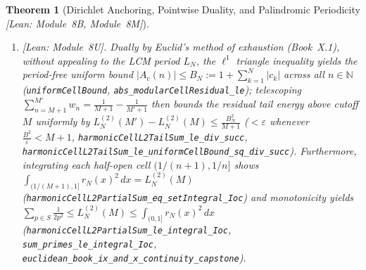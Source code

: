 \documentclass[10pt,a4paper]{article}
\newtheorem{theorem}{Theorem}[section]
\theoremstyle{definition}
\begin{document}
\begin{theorem}[Dirichlet Anchoring, Pointwise Duality, and Palindromic Periodicity \emph{[Lean: Module~8B, Module~8M]}]
\begin{enumerate}[leftmargin=1.8em,itemsep=2pt]
\item \emph{[Lean: Module~8U].} Dually by Euclid's method of exhaustion (Book~X.1), without appealing to the LCM period $L_N$, the $\ell^1$ triangle inequality yields the period-free uniform bound $|A_c(n)| \le B_N := 1 + \sum_{k=1}^N |c_k|$ across all $n \in \mathbb{N}$ (\texttt{uniformCellBound}, \texttt{abs\_\allowbreak modularCellResidual\_\allowbreak le}); telescoping $\sum_{n=M+1}^{M'} w_n = \frac{1}{M+1} - \frac{1}{M'+1}$ then bounds the residual tail energy above cutoff $M$ uniformly by $L_N^{(2)}(M') - L_N^{(2)}(M) \le \frac{B_N^2}{M+1}$ ($< \varepsilon$ whenever $\frac{B^2}{\varepsilon} < M + 1$, \texttt{harmonicCellL2TailSum\_\allowbreak le\_\allowbreak div\_\allowbreak succ}, \texttt{harmonicCellL2TailSum\_\allowbreak le\_\allowbreak uniformCellBound\_\allowbreak sq\_\allowbreak div\_\allowbreak succ}). Furthermore, integrating each half-open cell $(1/(n+1), 1/n]$ shows $\int_{(1/(M+1), 1]} r_N(x)^2\,dx = L_N^{(2)}(M)$ (\texttt{harmonicCellL2PartialSum\_\allowbreak eq\_\allowbreak setIntegral\_\allowbreak Ioc}) and monotonicity yields $\sum_{p \in S}\frac{1}{2p^2} \le L_N^{(2)}(M) \le \int_{(0,1]} r_N(x)^2\,dx$ (\texttt{harmonicCellL2PartialSum\_\allowbreak le\_\allowbreak integral\_\allowbreak Ioc}, \texttt{sum\_\allowbreak primes\_\allowbreak le\_\allowbreak integral\_\allowbreak Ioc}, \texttt{euclidean\_\allowbreak book\_\allowbreak ix\_\allowbreak and\_\allowbreak x\_\allowbreak continuity\_\allowbreak capstone}).
\end{enumerate}
\end{theorem}
\end{document}
